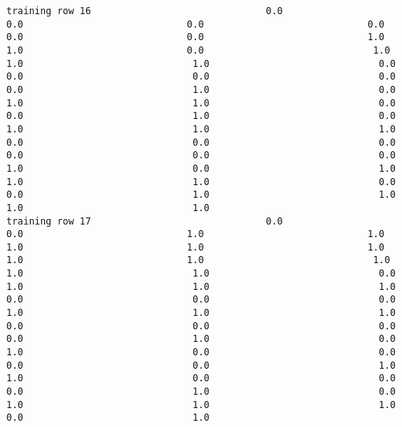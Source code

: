 \documentclass[11pt]{article}
\begin{document}
\begin{verbatim}
training row 16                               0.0                             0.0                             0.0                             0.0                             0.0                             0.0                             1.0                             1.0                             0.0                              1.0                              1.0                              1.0                              0.0                              0.0                              0.0                              0.0                              0.0                              1.0                              0.0                              1.0                              1.0                              0.0                              0.0                              1.0                              0.0                              1.0                              1.0                              1.0                              0.0                              0.0                              0.0                              0.0                              0.0                              0.0                              1.0                              0.0                              1.0                              1.0                              1.0                              0.0                              0.0                              1.0                              1.0                              1.0                              1.0
training row 17                               0.0                             0.0                             1.0                             1.0                             1.0                             1.0                             1.0                             1.0                             1.0                              1.0                              1.0                              1.0                              0.0                              1.0                              1.0                              1.0                              0.0                              0.0                              0.0                              1.0                              1.0                              1.0                              0.0                              0.0                              0.0                              0.0                              1.0                              0.0                              1.0                              0.0                              0.0                              0.0                              0.0                              1.0                              1.0                              0.0                              0.0                              0.0                              1.0                              0.0                              1.0                              1.0                              1.0                              0.0                              1.0

\end{verbatim}
\end{document}
